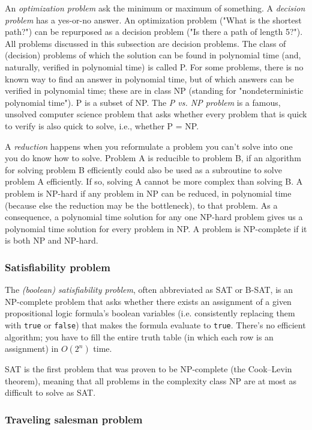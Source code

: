 \documentclass[table, xcdraw]{article}%
\begin{document}
An \emph{optimization problem} ask the minimum or maximum of something. A \emph{decision problem} has a yes-or-no answer. An optimization problem ("What is the shortest path?") can be repurposed as a decision problem ("Is there a path of length 5?"). All problems discussed in this subsection are decision problems. The class of (decision) problems of which the solution can be found in polynomial time (and, naturally, verified in polynomial time) is called P. For some problems, there is no known way to find an answer in polynomial time, but of which answers can be verified in polynomial time; these are in class NP (standing for "nondeterministic polynomial time"). P is a subset of NP. The \emph{P vs. NP problem} is a famous, unsolved computer science problem that asks whether every problem that is quick to verify is also quick to solve, i.e., whether P = NP.

A \emph{reduction} happens when you reformulate a problem you can't solve into one you do know how to solve. Problem A is reducible to problem B, if an algorithm for solving problem B efficiently could also be used as a subroutine to solve problem A efficiently. If so, solving A cannot be more complex than solving B. A problem is NP-hard if any problem in NP can be reduced, in polynomial time (because else the reduction may be the bottleneck), to that problem. As a consequence, a polynomial time solution for any one NP-hard problem gives us
a polynomial time solution for every problem in NP. A problem is NP-complete if it is both NP and NP-hard.

\subsubsection{Satisfiability problem}

The \emph{(boolean) satisfiability problem}, often abbreviated as SAT or B-SAT, is an NP-complete problem that asks whether there exists an assignment of a given propositional logic formula's boolean variables (i.e. consistently replacing them with \texttt{true} or \texttt{false}) that makes the formula evaluate to \texttt{true}. There's no efficient algorithm; you have to fill the entire truth table (in which each row is an assignment) in $O(2^n)$ time.

SAT is the first problem that was proven to be NP-complete (the Cook–Levin theorem), meaning that all problems in the complexity class NP are at most as difficult to solve as SAT.

\subsubsection{Traveling salesman problem}
\end{document}
